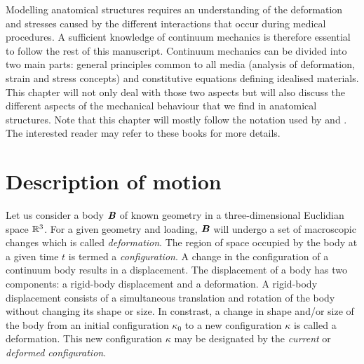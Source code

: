 Modelling anatomical structures requires an understanding of the deformation and stresses caused by the different interactions that occur during medical procedures. A sufficient knowledge of continuum mechanics is therefore essential to follow the rest of this manuscript. Continuum mechanics can be divided into two main parts: general principles common to all media (analysis of deformation, strain and stress concepts) and constitutive equations defining idealised materials. This chapter will not only deal with those two aspects but will also discuss the different aspects of the mechanical behaviour that we find in anatomical structures. Note that this chapter will mostly follow the notation used by \cite{Bonnet97} and \cite{Reddy07}. The interested reader may refer to these books for more details.  


\section{Description of motion} 	\label{chap2:descriptionMotion}
Let us consider a body $\textbf{\textit{B}}$ of known geometry in a three-dimensional Euclidian space $\mathbb{R}^3$. For a given geometry and loading, $\textbf{\textit{B}}$ will undergo a set of macroscopic changes which is called \emph{deformation}. The region of space occupied by the body at a given time $t$ is termed a \emph{configuration}. A change in the configuration of a continuum body results in a displacement. The displacement of a body has two components: a rigid-body displacement and a deformation. A rigid-body displacement consists of a simultaneous translation and rotation of the body without changing its shape or size. \ON In constrast, a change in shape and\slash or size of the body from an initial configuration $\kappa_{0}$ to a new configuration $\kappa$ is called a deformation. This new configuration $\kappa$ may be designated by the \emph{current} or \emph{deformed configuration}. \OFF

